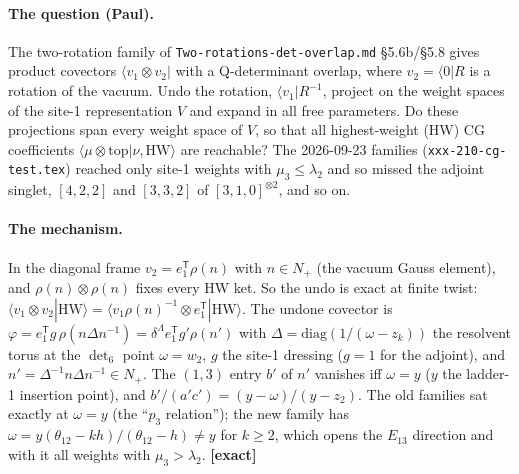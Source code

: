 \documentclass[11pt]{article}
\newcommand{\bra}[1]{\langle #1|}
\newcommand{\eT}{e_1^{\mathsf T}}
\newcommand{\thh}{\theta_{12}}
\newcommand{\ex}{\textbf{[exact]}}
\newcommand{\nb}[1]{\texttt{#1}}
\begin{document}
\paragraph{The question (Paul).} The two-rotation family of \nb{Two-rotations-det-overlap.md} \S5.6b/\S5.8 gives product covectors $\bra{v_1\otimes v_2}$ with a Q-determinant overlap, where $v_2=\bra0R$ is a rotation of the vacuum. Undo the rotation, $\bra{v_1}R^{-1}$, project on the weight spaces of the site-1 representation $V$ and expand in all free parameters. Do these projections span every weight space of $V$, so that all highest-weight (HW) CG coefficients $\langle\mu\otimes\mathrm{top}|\nu,\mathrm{HW}\rangle$ are reachable? The 2026-09-23 families (\nb{xxx-210-cg-test.tex}) reached only site-1 weights with $\mu_3\le\lambda_2$ and so missed the adjoint singlet, $[4,2,2]$ and $[3,3,2]$ of $[3,1,0]^{\otimes2}$, and so on.

\paragraph{The mechanism.} In the diagonal frame $v_2=\eT\rho(n)$ with $n\in N_+$ (the vacuum Gauss element), and $\rho(n)\otimes\rho(n)$ fixes every HW ket. So the undo is exact at finite twist: $\langle v_1\otimes v_2|\mathrm{HW}\rangle=\langle v_1\rho(n)^{-1}\otimes\eT|\mathrm{HW}\rangle$. The undone covector is $\varphi=\eT g\,\rho(n\Delta n^{-1})=\delta^\Lambda\eT g'\rho(n')$ with $\Delta=\mathrm{diag}(1/(\omega-z_k))$ the resolvent torus at the $\det_6$ point $\omega=w_2$, $g$ the site-1 dressing ($g=1$ for the adjoint), and $n'=\Delta^{-1}n\Delta n^{-1}\in N_+$. The $(1,3)$ entry $b'$ of $n'$ vanishes iff $\omega=y$ ($y$ the ladder-1 insertion point), and $b'/(a'c')=(y-\omega)/(y-z_2)$. The old families sat exactly at $\omega=y$ (the ``$p_3$ relation''); the new family has $\omega=y(\thh-kh)/(\thh-h)\ne y$ for $k\ge2$, which opens the $E_{13}$ direction and with it all weights with $\mu_3>\lambda_2$. \ex
\end{document}
